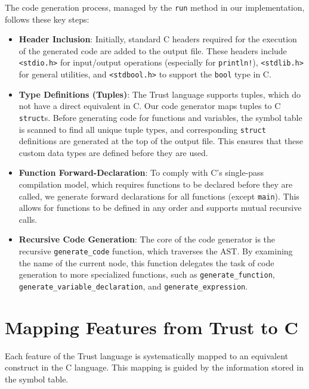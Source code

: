 \documentclass[12pt, a4paper]{report}
\begin{document}
The code generation process, managed by the \texttt{run} method in our implementation, follows these key steps:

\begin{itemize}
    \item \textbf{Header Inclusion}: Initially, standard C headers required for the execution of the generated code are added to the output file. These headers include \texttt{<stdio.h>} for input/output operations (especially for \texttt{println!}), \texttt{<stdlib.h>} for general utilities, and \texttt{<stdbool.h>} to support the \texttt{bool} type in C.

    \item \textbf{Type Definitions (Tuples)}: The Trust language supports tuples, which do not have a direct equivalent in C. Our code generator maps tuples to C \texttt{struct}s. Before generating code for functions and variables, the symbol table is scanned to find all unique tuple types, and corresponding \texttt{struct} definitions are generated at the top of the output file. This ensures that these custom data types are defined before they are used.

    \item \textbf{Function Forward-Declaration}: To comply with C's single-pass compilation model, which requires functions to be declared before they are called, we generate forward declarations for all functions (except \texttt{main}). This allows for functions to be defined in any order and supports mutual recursive calls.

    \item \textbf{Recursive Code Generation}: The core of the code generator is the recursive \texttt{generate\_code} function, which traverses the AST. By examining the name of the current node, this function delegates the task of code generation to more specialized functions, such as \texttt{generate\_function}, \texttt{generate\_variable\_declaration}, and \texttt{generate\_expression}.
\end{itemize}

\section{Mapping Features from Trust to C}
Each feature of the Trust language is systematically mapped to an equivalent construct in the C language. This mapping is guided by the information stored in the symbol table.
\end{document}

